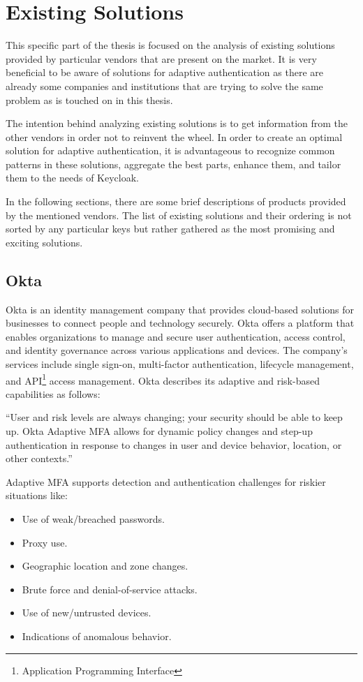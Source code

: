 \chapter{Existing Solutions}

This specific part of the thesis is focused on the analysis of existing solutions provided by particular vendors that are present on the market.
It is very beneficial to be aware of solutions for adaptive authentication as there are already some companies and institutions that are trying to solve the same problem as is touched on in this thesis.

The intention behind analyzing existing solutions is to get information from the other vendors in order not to reinvent the wheel.
In order to create an optimal solution for adaptive authentication, it is advantageous to recognize common patterns in these solutions, aggregate the best parts, enhance them, and tailor them to the needs of Keycloak. 

In the following sections, there are some brief descriptions of products provided by the mentioned vendors.
The list of existing solutions and their ordering is not sorted by any particular keys but rather gathered as the most promising and exciting solutions.

\section{Okta}

Okta is an identity management company that provides cloud-based solutions for businesses to connect people and technology securely.
Okta offers a platform that enables organizations to manage and secure user authentication, access control, and identity governance across various applications and devices.
The company's services include single sign-on, multi-factor authentication, lifecycle management, and API\footnote{Application Programming Interface} access management.
Okta describes its adaptive and risk-based capabilities as follows:

``User and risk levels are always changing; your security should be able to keep up.
Okta Adaptive MFA allows for dynamic policy changes and step-up authentication in response to changes in user and device behavior, location, or other contexts.''\cite{existing-okta}

\newpage
Adaptive MFA supports detection and authentication challenges for riskier situations like:

\begin{itemize}
    \item Use of weak/breached passwords.
    \item Proxy use.
    \item Geographic location and zone changes.
    \item Brute force and denial-of-service attacks.
    \item Use of new/untrusted devices.
    \item Indications of anomalous behavior. 
\end{itemize}

